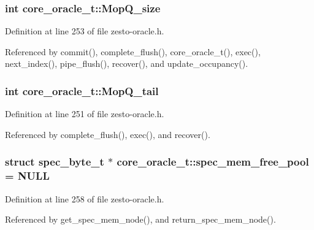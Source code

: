 \subsubsection[{MopQ\_\-size}]{\setlength{\rightskip}{0pt plus 5cm}int {\bf core\_\-oracle\_\-t::MopQ\_\-size}\hspace{0.3cm}{\tt  [protected]}}\label{classcore__oracle__t_004d660ced8ad0c50b52372465d27012}




Definition at line 253 of file zesto-oracle.h.

Referenced by commit(), complete\_\-flush(), core\_\-oracle\_\-t(), exec(), next\_\-index(), pipe\_\-flush(), recover(), and update\_\-occupancy().
\subsubsection[{MopQ\_\-tail}]{\setlength{\rightskip}{0pt plus 5cm}int {\bf core\_\-oracle\_\-t::MopQ\_\-tail}\hspace{0.3cm}{\tt  [protected]}}\label{classcore__oracle__t_f309d834c383b98e92101c00d3ac3133}




Definition at line 251 of file zesto-oracle.h.

Referenced by complete\_\-flush(), exec(), and recover().
\subsubsection[{spec\_\-mem\_\-free\_\-pool}]{\setlength{\rightskip}{0pt plus 5cm}struct {\bf spec\_\-byte\_\-t} $\ast$ {\bf core\_\-oracle\_\-t::spec\_\-mem\_\-free\_\-pool} = NULL\hspace{0.3cm}{\tt  [static, read, protected]}}\label{classcore__oracle__t_40543fe5b0ca253b04d69a6f6e69ca10}




Definition at line 258 of file zesto-oracle.h.

Referenced by get\_\-spec\_\-mem\_\-node(), and return\_\-spec\_\-mem\_\-node().
